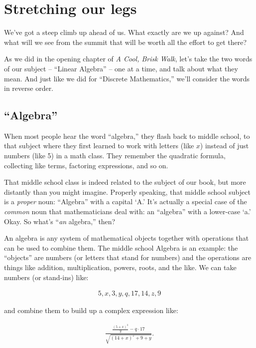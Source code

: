 
\chapter{Stretching our legs}

We've got a steep climb up ahead of us. What exactly are we up against? And
what will we see from the summit that will be worth all the effort to get
there?

As we did in the opening chapter of \textit{A Cool, Brisk Walk}, let's take the
two words of our subject -- ``Linear Algebra'' -- one at a time, and talk about
what they mean. And just like we did for ``Discrete Mathematics,'' we'll
consider the words in reverse order.

\section{``Algebra''}

When most people hear the word ``algebra,'' they flash back to middle school,
to that subject where they first learned to work with letters (like $x$)
instead of just numbers (like 5) in a math class. They remember the quadratic
formula, collecting like terms, factoring expressions, and so on.

That middle school class is indeed related to the subject of our book, but more
distantly than you might imagine. Properly speaking, that middle school subject
is a \textit{proper} noun: ``Algebra'' with a capital `A.' It's actually a
special case of the \textit{common} noun that mathematicians deal with: an
``algebra'' with a lower-case `a.' Okay. So what's ``\textit{an} algebra,''
then?

An algebra is any system of mathematical objects together with operations that
can be used to combine them. The middle school Algebra is an example: the
``objects'' are numbers (or letters that stand for numbers) and the operations
are things like addition, multiplication, powers, roots, and the like. We can
take numbers (or stand-ins) like:

\vspace{-.25in}
\begin{align*}
5, x, 3, y, q, 17, 14, z, 9
\end{align*}

and combine them to build up a complex expression like:

\vspace{-.25in}
\begin{align*}
\frac{\frac{(5+x)^3}{y} - q\cdot 17}{\sqrt{(14+x)^z + 9+y}}.
\end{align*}

